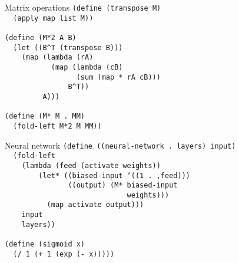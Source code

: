\documentclass{beamer}
\begin{document}
\begin{frame}{Matrix operations}
  \texttt{(define (transpose M) \\ \pause
    \ \ (apply map list M)) \\ \pause
    \ \\
    (define (M*2 A B) \\ \pause
    \ \ (let ((B\^{}T (transpose B))) \\ \pause
    \ \ \ \ (map (lambda (rA) \\
    \ \ \ \ \ \ \ \ \ \ \ (map (lambda (cB) \\
    \ \ \ \ \ \ \ \ \ \ \ \ \ \ \ \ \ (sum (map * rA cB)))\\
    \ \ \ \ \ \ \ \ \ \ \ \ \ \ \ B\^{}T))\\
    \ \ \ \ \ \ \ \ \ A)))\\ \pause
    \ \\
    (define (M* M . MM)\\ \pause
    \ \ (fold-left M*2 M MM))
  }
\end{frame}

\begin{frame}{Neural network}
  \texttt{(define ((neural-network . layers) input) \\ \pause
    \ \ (fold-left \\
    \ \ \ \ (lambda (feed (activate weights)) \\ \pause
    \ \ \ \ \ \ \ \ (let* ((biased-input `((1 . ,feed))) \\ \pause
    \ \ \ \ \ \ \ \ \ \ \ \ \ \ \ ((output) (M* biased-input \\
    \ \ \ \ \ \ \ \ \ \ \ \ \ \ \ \ \ \ \ \ \ \ \ \ \ \ \ \ \ weights))) \\ \pause
    \ \ \ \ \ \ \ \ \ \ (map activate output))) \\ \pause
    \ \ \ \ input \\
    \ \ \ \ layers))\\ \pause
    \ \\
    (define (sigmoid x) \\
    \ \ (/ 1 (+ 1 (exp (- x)))))
  }
\end{frame}
\end{document}

